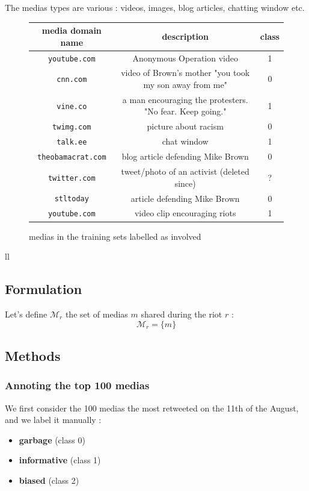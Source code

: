 \documentclass[a4paper,12pt]{report}
\begin{document}
The medias types are various : videos, images, blog articles, chatting window etc.
\begin{figure}[H]
  \centering
\begin{tabular}{|c|c|c|}
\hline
media domain name & description & class \\ \hline
\texttt{youtube.com} & Anonymous Operation video & 1 \\ \hline
\texttt{cnn.com} & video of Brown's mother "you took my son away from me" & 0 \\
\texttt{vine.co} & a man encouraging the protesters. "No fear. Keep going." & 1 \\ \hline
\texttt{twimg.com} & picture about racism & 0 \\ \hline
\texttt{talk.ee} & chat window & 1 \\ \hline
\texttt{theobamacrat.com} & blog article defending Mike Brown & 0 \\ \hline
\texttt{twitter.com} & tweet/photo of an activist (deleted since) & ? \\ \hline
\texttt{stltoday} & article defending Mike Brown & 0 \\ \hline
\texttt{youtube.com} & video clip encouraging riots & 1 \\ \hline
\hline
\end{tabular}
\label{tweets500mediasBiaised}
\caption{medias in the training sets labelled as involved}
\end{figure}
\newpage
ll
\newpage
\subsection{Formulation}
Let's define $\mathcal{M}_r$ the set of medias $m$ shared during the riot $r$ :
$$ \mathcal{M}_r = \{ m \} $$ 

\subsection{Methods}

\subsubsection{Annoting the top 100 medias}
We first consider the 100 medias the most retweeted on the 11th of the August, and we label it manually :
\begin{itemize}
\item \textbf{garbage} (class 0)
\item \textbf{informative} (class 1)
\item \textbf{biased} (class 2)
\end{itemize}
\end{document}
